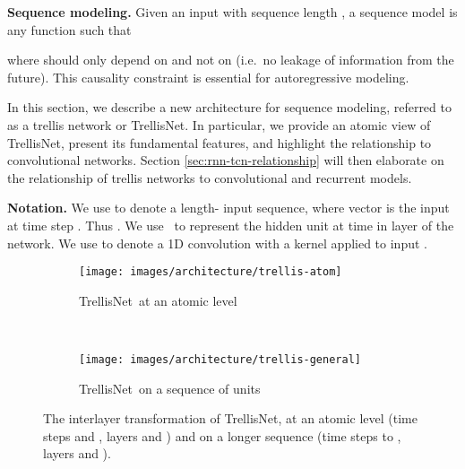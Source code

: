 \documentclass{article} \usepackage{iclr2019_conference,times}
\newcommand\mypara[1]{\vspace{0mm}\noindent\textbf{#1}}
\newcommand{\model}{TrellisNet}
\begin{document}
\mypara{Sequence modeling.}
Given an input  with sequence length , a sequence model is any function  such that

where  should only depend on  and not on  (i.e.\ no leakage of information from the future). This causality constraint is essential for autoregressive modeling.

In this section, we describe a new architecture for sequence modeling, referred to as a trellis network or TrellisNet. In particular, we provide an atomic view of \model, present its fundamental features, and highlight the relationship to convolutional networks. Section \ref{sec:rnn-tcn-relationship} will then elaborate on the relationship of trellis networks to convolutional and recurrent models.

\mypara{Notation.}
We use  to denote a length- input sequence, where vector  is the input at time step . Thus . We use \small\normalsize\ to represent the hidden unit at time  in layer  of the network. We use  to denote a 1D convolution with a kernel  applied to input .


\begin{figure}[t]
    \vspace{-.2in}
    \centering
    \begin{subfigure}[b]{.33\textwidth}
        \centering
        \texttt{[image: images/architecture/trellis-atom]}
        \caption{\model~at an atomic level}
        \label{fig:trellis-atom}
    \end{subfigure}
    ~
    \begin{subfigure}[b]{.59\textwidth}
        \centering
        \texttt{[image: images/architecture/trellis-general]}
        \caption{\model~on a sequence of units}
        \label{fig:trellis-general}
    \end{subfigure}
    \vspace{-1mm}
    \caption{The interlayer transformation of \model, at an atomic level (time steps  and , layers  and ) and on a longer sequence (time steps  to , layers  and ).}
    \label{fig:generic-trellis-network}
    \vspace{-3mm}
\end{figure}
\end{document}
